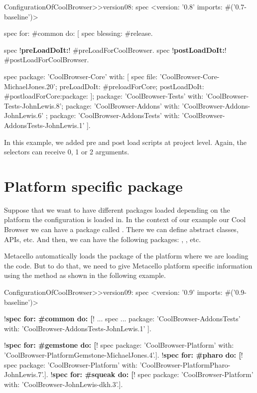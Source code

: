 \documentclass[a4paper,10pt,twoside]{book}
\begin{document}
\begin{code}{} 
ConfigurationOfCoolBrowser>>version08: spec 
       <version: '0.8' imports: #('0.7-baseline')>
       
       spec for: #common do: [
              spec blessing: #release.
              
              spec !\textbf{preLoadDoIt:}! #preLoadForCoolBrowser.
              spec !\textbf{postLoadDoIt:}! #postLoadForCoolBrowser.
       
              spec 
                     package: 'CoolBrowser-Core' with: [
                            spec 
                                   file: 'CoolBrowser-Core-MichaelJones.20';
                                   preLoadDoIt: #preloadForCore;
                                   postLoadDoIt: #postloadForCore:package: ];
                     package: 'CoolBrowser-Tests' with: 'CoolBrowser-Tests-JohnLewis.8';
                     package: 'CoolBrowser-Addons' with: 'CoolBrowser-Addons-JohnLewis.6' ;
                     package: 'CoolBrowser-AddonsTests' with: 'CoolBrowser-AddonsTests-JohnLewis.1' ].
\end{code}

In this example, we added pre and post load scripts at project level. Again, the selectors can receive 0, 1 or 2 arguments. 


\section {Platform specific package}

Suppose that we want to have different packages loaded depending on the platform the configuration is loaded in. In the context of our example our Cool Browser we can have a package called . There we can define abstract classes, APIs, etc. And then, we can have the following packages: , , etc.

Metacello automatically loads the package of the platform where we are loading the code. But to do that, we need to give Metacello  platform specific information using the method  as shown in the following example.

\begin{code}{} 
ConfigurationOfCoolBrowser>>version09: spec 
       <version: '0.9' imports: #('0.9-baseline')>
       
       !\textbf{spec for: \#common do: [}!
              ...
              spec 
                 ...
                     package: 'CoolBrowser-AddonsTests' with: 'CoolBrowser-AddonsTests-JohnLewis.1' ].
       
       !\textbf{spec for: \#gemstone do: [}!
              spec package: 'CoolBrowser-Platform' with: 'CoolBrowser-PlatformGemstone-MichaelJones.4'.].
       !\textbf{spec for: \#pharo do: [}!
              spec package: 'CoolBrowser-Platform' with: 'CoolBrowser-PlatformPharo-JohnLewis.7'.].
       !\textbf{spec for: \#squeak do: [}!
              spec package: 'CoolBrowser-Platform' with: 'CoolBrowser-JohnLewis-dkh.3'.].
\end{code}
\end{document}
